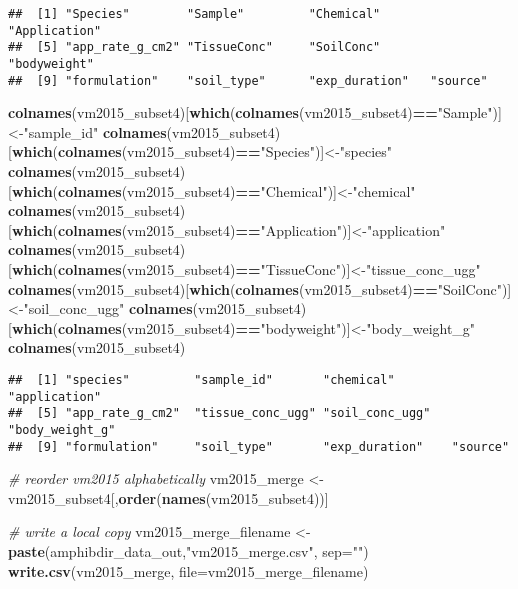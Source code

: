 \documentclass[
]{article}
\newenvironment{Shaded}{\begin{snugshade}}{\end{snugshade}}
\newcommand{\CommentTok}[1]{\textcolor[rgb]{0.56,0.35,0.01}{\textit{#1}}}
\newcommand{\DataTypeTok}[1]{\textcolor[rgb]{0.13,0.29,0.53}{#1}}
\newcommand{\KeywordTok}[1]{\textcolor[rgb]{0.13,0.29,0.53}{\textbf{#1}}}
\newcommand{\NormalTok}[1]{#1}
\newcommand{\OperatorTok}[1]{\textcolor[rgb]{0.81,0.36,0.00}{\textbf{#1}}}
\newcommand{\StringTok}[1]{\textcolor[rgb]{0.31,0.60,0.02}{#1}}
\begin{document}
\begin{verbatim}
##  [1] "Species"        "Sample"         "Chemical"       "Application"   
##  [5] "app_rate_g_cm2" "TissueConc"     "SoilConc"       "bodyweight"    
##  [9] "formulation"    "soil_type"      "exp_duration"   "source"
\end{verbatim}

\begin{Shaded}
\begin{Highlighting}[]
\KeywordTok{colnames}\NormalTok{(vm2015_subset4)[}\KeywordTok{which}\NormalTok{(}\KeywordTok{colnames}\NormalTok{(vm2015_subset4)}\OperatorTok{==}\StringTok{"Sample"}\NormalTok{)]<-}\StringTok{"sample_id"}
\KeywordTok{colnames}\NormalTok{(vm2015_subset4)[}\KeywordTok{which}\NormalTok{(}\KeywordTok{colnames}\NormalTok{(vm2015_subset4)}\OperatorTok{==}\StringTok{"Species"}\NormalTok{)]<-}\StringTok{"species"}
\KeywordTok{colnames}\NormalTok{(vm2015_subset4)[}\KeywordTok{which}\NormalTok{(}\KeywordTok{colnames}\NormalTok{(vm2015_subset4)}\OperatorTok{==}\StringTok{"Chemical"}\NormalTok{)]<-}\StringTok{"chemical"}
\KeywordTok{colnames}\NormalTok{(vm2015_subset4)[}\KeywordTok{which}\NormalTok{(}\KeywordTok{colnames}\NormalTok{(vm2015_subset4)}\OperatorTok{==}\StringTok{"Application"}\NormalTok{)]<-}\StringTok{"application"}
\KeywordTok{colnames}\NormalTok{(vm2015_subset4)[}\KeywordTok{which}\NormalTok{(}\KeywordTok{colnames}\NormalTok{(vm2015_subset4)}\OperatorTok{==}\StringTok{"TissueConc"}\NormalTok{)]<-}\StringTok{"tissue_conc_ugg"}
\KeywordTok{colnames}\NormalTok{(vm2015_subset4)[}\KeywordTok{which}\NormalTok{(}\KeywordTok{colnames}\NormalTok{(vm2015_subset4)}\OperatorTok{==}\StringTok{"SoilConc"}\NormalTok{)]<-}\StringTok{"soil_conc_ugg"}
\KeywordTok{colnames}\NormalTok{(vm2015_subset4)[}\KeywordTok{which}\NormalTok{(}\KeywordTok{colnames}\NormalTok{(vm2015_subset4)}\OperatorTok{==}\StringTok{"bodyweight"}\NormalTok{)]<-}\StringTok{"body_weight_g"}
\KeywordTok{colnames}\NormalTok{(vm2015_subset4)}
\end{Highlighting}
\end{Shaded}

\begin{verbatim}
##  [1] "species"         "sample_id"       "chemical"        "application"    
##  [5] "app_rate_g_cm2"  "tissue_conc_ugg" "soil_conc_ugg"   "body_weight_g"  
##  [9] "formulation"     "soil_type"       "exp_duration"    "source"
\end{verbatim}

\begin{Shaded}
\begin{Highlighting}[]
\CommentTok{# reorder vm2015 alphabetically}
\NormalTok{vm2015_merge <-}\StringTok{ }\NormalTok{vm2015_subset4[,}\KeywordTok{order}\NormalTok{(}\KeywordTok{names}\NormalTok{(vm2015_subset4))]}

\CommentTok{# write a local copy}
\NormalTok{vm2015_merge_filename <-}\StringTok{ }\KeywordTok{paste}\NormalTok{(amphibdir_data_out,}\StringTok{"vm2015_merge.csv"}\NormalTok{, }\DataTypeTok{sep=}\StringTok{""}\NormalTok{)}
\KeywordTok{write.csv}\NormalTok{(vm2015_merge, }\DataTypeTok{file=}\NormalTok{vm2015_merge_filename)}
\end{Highlighting}
\end{Shaded}
\end{document}

